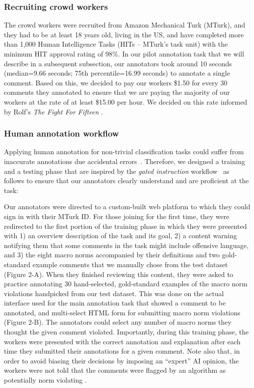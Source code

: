 

\subsubsection{Recruiting  crowd workers} 
The crowd workers were recruited from Amazon Mechanical Turk (MTurk), and they had to be at least 18 years old, living in the US, and have completed more than 1,000 Human Intelligence Tasks (HITs – MTurk’s task unit) with the minimum HIT approval rating of 98\%. In our pilot annotation task that we will describe in a subsequent subsection, our annotators took around 10 seconds (median=9.66 seconds; 75th percentile=16.99 seconds) to annotate a single comment. Based on this, we decided to pay our workers \$1.50 for every 30 comments they annotated to ensure that we are paying the majority of our workers at the rate of at least \$15.00 per hour. We decided on this rate informed by Rolf's \textit{The Fight For Fifteen} \cite{20_Rolf}.

\subsubsection{Human annotation workflow} 
Applying human annotation for non-trivial classification tasks could suffer from inaccurate annotations due accidental errors~\cite{22_Angeli, 23_Pershina, 24_Zhang}. Therefore, we designed a training and a testing phase that are inspired by the \textit{gated instruction} workflow~\cite{25_Liu} as follows to ensure that our annotators clearly understand and are proficient at the task:

Our annotators were directed to a custom-built web platform to which they could sign in with their MTurk ID. For those joining for the first time, they were redirected to the first portion of the training phase in which they were presented with 1) an overview description of the task and its goal, 2) a content warning notifying them that some comments in the task might include offensive language, and 3) the eight macro norms accompanied by their definitions and two gold-standard example comments that we manually chose from the test dataset (Figure 2-A). When they finished reviewing this content, they were asked to practice annotating 30 hand-selected, gold-standard examples of the macro norm violations handpicked from our test dataset. This was done on the actual interface used for the main annotation task that showed a comment to be annotated, and multi-select HTML form for submitting macro norm violations (Figure 2-B). The annotators could select any number of macro norms they thought the given comment violated. Importantly, during this training phase, the workers were presented with the correct annotation and explanation after each time they submitted their annotations for a given comment. Note also that, in order to avoid biasing their decisions by imposing an ``expert'' AI opinion, the workers were not told that the comments were flagged by an algorithm as potentially norm violating \cite{seering2020reconsidering}.

